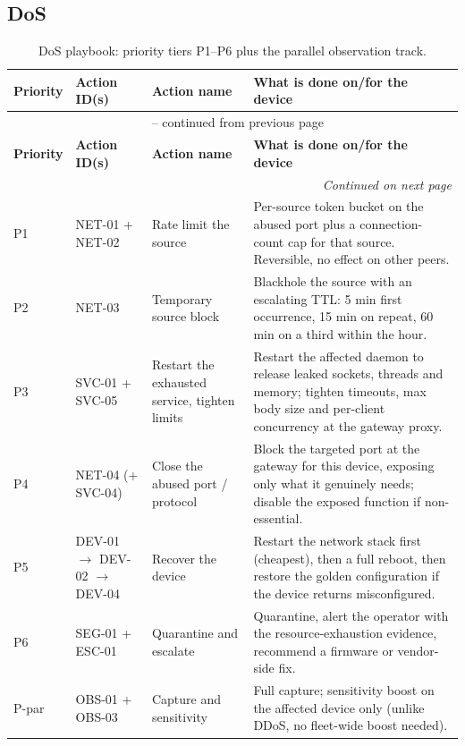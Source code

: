 \subsection{DoS}

\begin{longtable}{|p{}|p{}|p{}|p{}|}
\caption{DoS playbook: priority tiers P1--P6 plus the parallel observation track.}
\label{tab:playbook_dos}\\
\hline
\textbf{Priority} & \textbf{Action ID(s)} & \textbf{Action name} & \textbf{What is done on/for the device} \\
\hline
\endfirsthead
\multicolumn{4}{c}{\tablename\ \thetable{} -- continued from previous page}\\
\hline
\textbf{Priority} & \textbf{Action ID(s)} & \textbf{Action name} & \textbf{What is done on/for the device} \\
\hline
\endhead
\hline \multicolumn{4}{r}{\textit{Continued on next page}}\\
\endfoot
\hline
\endlastfoot
P1 & NET-01 + NET-02 & Rate limit the source & Per-source token bucket on the abused port plus a connection-count cap for that source. Reversible, no effect on other peers. \\
\hline
P2 & NET-03 & Temporary source block & Blackhole the source with an escalating TTL: 5 min first occurrence, 15 min on repeat, 60 min on a third within the hour. \\
\hline
P3 & SVC-01 + SVC-05 & Restart the exhausted service, tighten limits & Restart the affected daemon to release leaked sockets, threads and memory; tighten timeouts, max body size and per-client concurrency at the gateway proxy. \\
\hline
P4 & NET-04 (+ SVC-04) & Close the abused port / protocol & Block the targeted port at the gateway for this device, exposing only what it genuinely needs; disable the exposed function if non-essential. \\
\hline
P5 & DEV-01 $\rightarrow$ DEV-02 $\rightarrow$ DEV-04 & Recover the device & Restart the network stack first (cheapest), then a full reboot, then restore the golden configuration if the device returns misconfigured. \\
\hline
P6 & SEG-01 + ESC-01 & Quarantine and escalate & Quarantine, alert the operator with the resource-exhaustion evidence, recommend a firmware or vendor-side fix. \\
\hline
P-par & OBS-01 + OBS-03 & Capture and sensitivity & Full capture; sensitivity boost on the affected device only (unlike DDoS, no fleet-wide boost needed). \\
\hline
\end{longtable}

